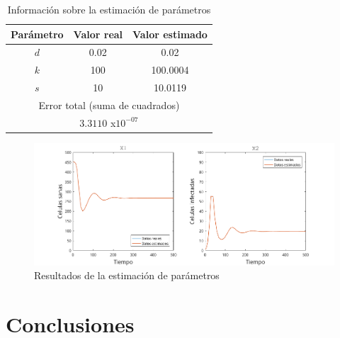 \documentclass{article}
\begin{document}
\begin{table}[H]
    \centering
    \begin{tabular}{|c|c|c|}
        \hline
        Parámetro & Valor real & Valor estimado\\
        \hline
        $d$       & 0.02       & 0.02\\
        $k$       & 100        & 100.0004\\
        $s$       & 10         & 10.0119\\
        \hline
        \multicolumn{3}{|c|}{Error total (suma de cuadrados)}\\
        \hline
        \multicolumn{3}{|c|}{$3.3110$ x$10^{-07}$}\\
        \hline
    \end{tabular}
    \caption{Información sobre la estimación de parámetros}
    \label{table:paramInfo}
\end{table}

\begin{figure}[H]
    \includegraphics[width=\textwidth]{Images/Estimated.png}
    \caption{Resultados de la estimación de parámetros}
    \label{plot:aftEstimation}
\end{figure}

\section{Conclusiones}
\end{document}
